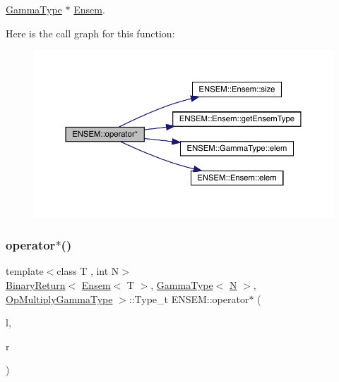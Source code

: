 \mbox{\hyperlink{classENSEM_1_1GammaType}{Gamma\+Type}} $\ast$ \mbox{\hyperlink{classENSEM_1_1Ensem}{Ensem}}. 

Here is the call graph for this function\+:\nopagebreak
\begin{figure}[H]
\begin{center}
\leavevmode
\includegraphics[width=350pt]{d1/d9e/group__eensem_ga399b896691f2d528edcade561c6e571d_cgraph}
\end{center}
\end{figure}
\mbox{\label{group__eensem_ga5a4ddba3b396c11e474246b57940a2cc}} 
\subsubsection{\texorpdfstring{operator$\ast$()}{operator*()}\hspace{0.1cm}{\footnotesize\ttfamily [7/11]}}
{\footnotesize\ttfamily template$<$class T , int N$>$ \\
\mbox{\hyperlink{structENSEM_1_1BinaryReturn}{Binary\+Return}}$<$ \mbox{\hyperlink{classENSEM_1_1Ensem}{Ensem}}$<$ T $>$, \mbox{\hyperlink{classENSEM_1_1GammaType}{Gamma\+Type}}$<$ \mbox{\hyperlink{operator__name__util_8cc_a7722c8ecbb62d99aee7ce68b1752f337}{N}} $>$, \mbox{\hyperlink{structENSEM_1_1OpMultiplyGammaType}{Op\+Multiply\+Gamma\+Type}} $>$\+::Type\+\_\+t E\+N\+S\+E\+M\+::operator$\ast$ (\begin{DoxyParamCaption}\item[{const \mbox{\hyperlink{classENSEM_1_1Ensem}{Ensem}}$<$ T $>$ \&}]{l,  }\item[{const \mbox{\hyperlink{classENSEM_1_1GammaType}{Gamma\+Type}}$<$ \mbox{\hyperlink{operator__name__util_8cc_a7722c8ecbb62d99aee7ce68b1752f337}{N}} $>$ \&}]{r }\end{DoxyParamCaption})\hspace{0.3cm}{\ttfamily [inline]}}



